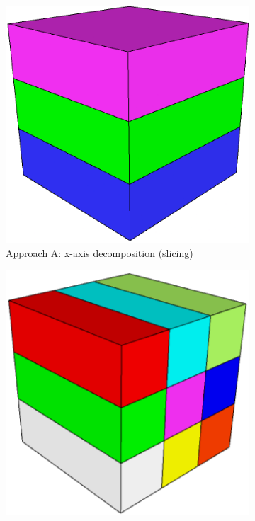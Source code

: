 \documentclass{article}
\begin{document}
\begin{figure}[ht]
    \centering
    \begin{subfigure}[b]{0.2\textwidth}
      \includegraphics[width=\textwidth]{img/decomp-1.png}
      \caption{Approach A: x-axis decomposition (slicing)}
      \label{subfig:a}
    \end{subfigure}
    \hfill
    \begin{subfigure}[b]{0.2\textwidth}
      \includegraphics[width=\textwidth]{img/decomp-2.png}

\end{subfigure}
\end{figure}
\end{document}
